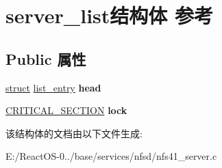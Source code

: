 \hypertarget{structserver__list}{}\section{server\+\_\+list结构体 参考}
\label{structserver__list}
\subsection*{Public 属性}
\begin{DoxyCompactItemize}
\item 
\mbox{\label{structserver__list_a72aa539c290548592dd4afe4096b25c5}} 
\hyperlink{interfacestruct}{struct} \hyperlink{structlist__entry}{list\+\_\+entry} {\bfseries head}
\item 
\mbox{\label{structserver__list_ae2e86f567953654ea29295986f67a967}} 
\hyperlink{struct___c_r_i_t_i_c_a_l___s_e_c_t_i_o_n}{C\+R\+I\+T\+I\+C\+A\+L\+\_\+\+S\+E\+C\+T\+I\+ON} {\bfseries lock}
\end{DoxyCompactItemize}


该结构体的文档由以下文件生成\+:\begin{DoxyCompactItemize}
\item 
E\+:/\+React\+O\+S-\/0../base/services/nfsd/nfs41\+\_\+server.\+c\end{DoxyCompactItemize}
